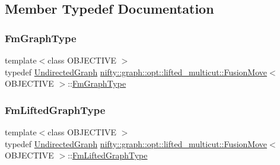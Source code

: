 \subsection{Member Typedef Documentation}
\mbox{\label{classnifty_1_1graph_1_1opt_1_1lifted__multicut_1_1FusionMove_a234a5bccc4dc41a7c197b7db12e4898b}} 
\subsubsection{\texorpdfstring{Fm\+Graph\+Type}{FmGraphType}}
{\footnotesize\ttfamily template$<$class O\+B\+J\+E\+C\+T\+I\+VE $>$ \\
typedef \hyperlink{classnifty_1_1graph_1_1UndirectedGraph}{Undirected\+Graph} \hyperlink{classnifty_1_1graph_1_1opt_1_1lifted__multicut_1_1FusionMove}{nifty\+::graph\+::opt\+::lifted\+\_\+multicut\+::\+Fusion\+Move}$<$ O\+B\+J\+E\+C\+T\+I\+VE $>$\+::\hyperlink{classnifty_1_1graph_1_1opt_1_1lifted__multicut_1_1FusionMove_a234a5bccc4dc41a7c197b7db12e4898b}{Fm\+Graph\+Type}}

\mbox{\label{classnifty_1_1graph_1_1opt_1_1lifted__multicut_1_1FusionMove_ab9d03730657ba20ba159d69913c0cced}} 
\subsubsection{\texorpdfstring{Fm\+Lifted\+Graph\+Type}{FmLiftedGraphType}}
{\footnotesize\ttfamily template$<$class O\+B\+J\+E\+C\+T\+I\+VE $>$ \\
typedef \hyperlink{classnifty_1_1graph_1_1UndirectedGraph}{Undirected\+Graph} \hyperlink{classnifty_1_1graph_1_1opt_1_1lifted__multicut_1_1FusionMove}{nifty\+::graph\+::opt\+::lifted\+\_\+multicut\+::\+Fusion\+Move}$<$ O\+B\+J\+E\+C\+T\+I\+VE $>$\+::\hyperlink{classnifty_1_1graph_1_1opt_1_1lifted__multicut_1_1FusionMove_ab9d03730657ba20ba159d69913c0cced}{Fm\+Lifted\+Graph\+Type}}

